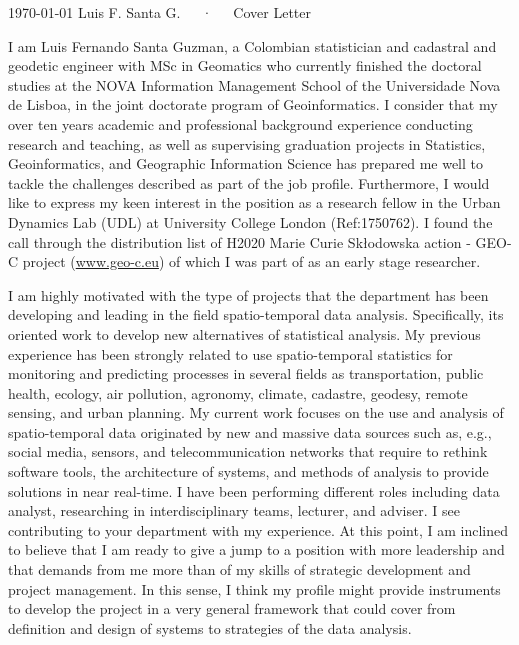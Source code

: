 \documentclass[11pt, a4paper]{awesome-cv}
\begin{document}
\makecvheader[R]

\makecvfooter
  {\today}
    {Luis F. Santa G.~~~·~~~Cover Letter}
  {}

\makelettertitle

\begin{cvletter}

I am Luis Fernando Santa Guzman, a Colombian statistician and cadastral and geodetic engineer with MSc in Geomatics who currently finished the doctoral studies at the NOVA Information Management School of the Universidade Nova de Lisboa, in the joint doctorate program of Geoinformatics. I consider that my over ten years academic and professional background experience conducting research and teaching, as well as supervising graduation projects in Statistics, Geoinformatics, and Geographic Information Science has prepared me well to tackle the challenges described as part of the job profile. Furthermore, I would like to express my keen interest in the position as a research fellow in the Urban Dynamics Lab (UDL) at University College London (Ref:1750762). I found the call through the distribution list of H2020 Marie Curie Skłodowska action - GEO-C project (\url{www.geo-c.eu}) of which I was part of as an early stage researcher.

I am highly motivated with the type of projects that the department has been developing and leading in the field spatio-temporal data analysis. Specifically, its oriented work to develop new alternatives of statistical analysis. My previous experience has been strongly related to use spatio-temporal statistics for monitoring and predicting processes in several fields as transportation, public health, ecology, air pollution, agronomy, climate, cadastre, geodesy, remote sensing, and urban planning. My current work focuses on the use and analysis of spatio-temporal data originated by new and massive data sources such as, e.g., social media, sensors, and telecommunication networks that require to rethink software tools, the architecture of systems, and methods of analysis to provide solutions in near real-time. I have been performing different roles including data analyst, researching in interdisciplinary teams, lecturer, and adviser. I see contributing to your department with my experience. At this point, I am inclined to believe that I am ready to give a jump to a position with more leadership and that demands from me more than of my skills of strategic development and project management. In this sense, I think my profile might provide instruments to develop the project in a very general framework that could cover from definition and design of systems to strategies of the data analysis.


\end{cvletter}
\end{document}
